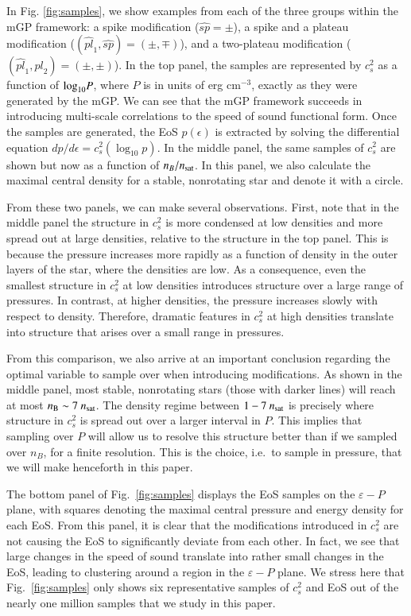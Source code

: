 \documentclass[aps,prd,nofootinbib,tightenlines,notitlepage,floatfix,superscriptaddress,showkeys,twocolumn]{revtex4-1}
\begin{document}
In Fig. \ref{fig:samples}, we show examples from each of the three groups within the mGP framework: a spike modification ($\widehat{sp}=\pm $), a spike and a plateau modification ($(\widehat{pl}_1,\widehat{sp})=(\pm,\mp)$), and a two-plateau modification ($(\widehat{pl}_1,\widehat{pl}_2)=(\pm,\pm)$). In the top panel, the samples are represented by $c_s^2$ as a function of ${\rm log}_{10} P$, where $P$ is in units of erg cm$^{-3}$, exactly as they were generated by the mGP. We can see that the mGP framework succeeds in introducing multi-scale correlations to the speed of sound functional form. Once the samples are generated, the EoS $p(\epsilon)$ is extracted by solving the differential equation $dp/d\epsilon = c_s^2(\log_{10}p)$. In the middle panel, the same samples of $c_s^2$ are shown but now as a function of $n_B/n_{\rm sat}$. In this panel, we also calculate the maximal central density for a stable, nonrotating star and denote it with a circle.

From these two panels, we can make several observations. First, note that in the middle panel the structure in $c_s^2$ is more condensed at low densities and more spread out at large densities, relative to the structure in the top panel. This is because the pressure increases more rapidly as a function of density in the outer layers of the star, where the densities are low. As a consequence, even the smallest structure in $c_s^2$ at low densities introduces structure over a large range of pressures. In contrast, at higher densities, the pressure increases slowly with respect to density. Therefore, dramatic features in $c_s^2$ at high densities translate into structure that arises over a small range in pressures. 

From this comparison, we also arrive at an important conclusion regarding the optimal variable to sample over when introducing modifications. As shown in the middle panel, most stable, nonrotating stars (those with darker lines) will reach at most $n_{\rm B} \sim 7 \ n_{\rm sat}$. The density regime between $1-7 \ n_{\rm sat}$ is precisely where structure in $c_s^2$ is spread out over a larger interval in $P$. This implies that sampling over $P$ will allow us to resolve this structure better than if we sampled over $n_B$, for a finite resolution. This is the choice, i.e.~to sample in pressure, that we will make henceforth in this paper. 

The bottom panel of Fig.~\ref{fig:samples} displays the EoS samples on the $\varepsilon-P$ plane, with squares denoting the maximal central pressure and energy density for each EoS. From this panel, it is clear that the modifications introduced in $c_s^2$ are not causing the EoS to significantly deviate from each other. In fact, we see that large changes in the speed of sound translate into rather small changes in the EoS, leading to clustering around a region in the $\varepsilon-P$ plane. We stress here that Fig.~\ref{fig:samples} only shows six representative samples of $c_s^2$ and EoS out of the nearly one million samples that we study in this paper. 
\end{document}
